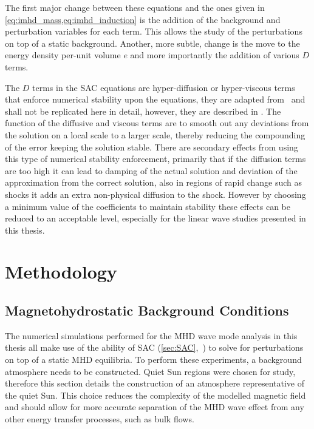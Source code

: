 \documentclass[a4paper,12pt,fourier,authoryear,custommargin]{Classes/PhDThesisPSnPDF}
\begin{document}
The first major change between these equations and the ones given in \cref{eq:imhd_mass,eq:imhd_induction} is the addition of the background and perturbation variables for each term.
This allows the study of the perturbations on top of a static background.
Another, more subtle, change is the move to the energy density per-unit volume $e$ and more importantly the addition of various $D$ terms.

The $D$ terms in the SAC equations are hyper-diffusion or hyper-viscous terms that enforce numerical stability upon the equations, they are adapted from~\cite{nordlund1995} and shall not be replicated here in detail, however, they are described in \citet{shelyag2008}.
The function of the diffusive and viscous terms are to smooth out any deviations from the solution on a local scale to a larger scale, thereby reducing the compounding of the error keeping the solution stable.
There are secondary effects from using this type of numerical stability enforcement, primarily that if the diffusion terms are too high it can lead to damping of the actual solution and deviation of the approximation from the correct solution, also in regions of rapid change such as shocks it adds an extra non-physical diffusion to the shock.
However by choosing a minimum value of the coefficients to maintain stability these effects can be reduced to an acceptable level, especially for the linear wave studies presented in this thesis.

\clearpage{}%
%

%
\clearpage{}%
\chapter{Methodology}\label{ch:methodology}  %


\section{Magnetohydrostatic Background Conditions}\label{sec:mhsbackground}

The numerical simulations performed for the MHD wave mode analysis in this thesis all make use of the ability of SAC (\cref{sec:SAC},~\citealt{shelyag2008}) to solve for perturbations on top of a static MHD equilibria.
To perform these experiments, a background atmosphere needs to be constructed.
Quiet Sun regions were chosen for study, therefore this section details the construction of an atmosphere representative of the quiet Sun.
This choice reduces the complexity of the modelled magnetic field and should allow for more accurate separation of the MHD wave effect from any other energy transfer processes, such as bulk flows.
\end{document}
